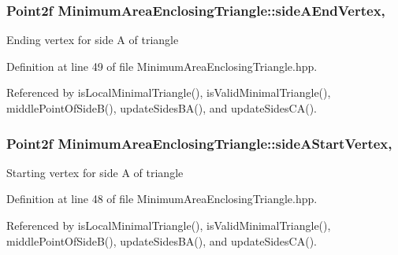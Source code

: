 \hypertarget{classmultiscale_1_1MinimumAreaEnclosingTriangle_abab8794502794dcbfc4b9336734ecae8}{
\subsubsection[{side\-A\-End\-Vertex}]{\setlength{\rightskip}{0pt plus 5cm}Point2f Minimum\-Area\-Enclosing\-Triangle\-::side\-A\-End\-Vertex\hspace{0.3cm}{\ttfamily [static]}, {\ttfamily [private]}}}\label{classmultiscale_1_1MinimumAreaEnclosingTriangle_abab8794502794dcbfc4b9336734ecae8}
Ending vertex for side A of triangle 

Definition at line 49 of file Minimum\-Area\-Enclosing\-Triangle.\-hpp.



Referenced by is\-Local\-Minimal\-Triangle(), is\-Valid\-Minimal\-Triangle(), middle\-Point\-Of\-Side\-B(), update\-Sides\-B\-A(), and update\-Sides\-C\-A().

\hypertarget{classmultiscale_1_1MinimumAreaEnclosingTriangle_a29a7a1a4b8cf544dbd7ccb75f653587e}{
\subsubsection[{side\-A\-Start\-Vertex}]{\setlength{\rightskip}{0pt plus 5cm}Point2f Minimum\-Area\-Enclosing\-Triangle\-::side\-A\-Start\-Vertex\hspace{0.3cm}{\ttfamily [static]}, {\ttfamily [private]}}}\label{classmultiscale_1_1MinimumAreaEnclosingTriangle_a29a7a1a4b8cf544dbd7ccb75f653587e}
Starting vertex for side A of triangle 

Definition at line 48 of file Minimum\-Area\-Enclosing\-Triangle.\-hpp.



Referenced by is\-Local\-Minimal\-Triangle(), is\-Valid\-Minimal\-Triangle(), middle\-Point\-Of\-Side\-B(), update\-Sides\-B\-A(), and update\-Sides\-C\-A().

